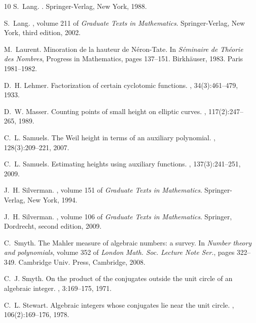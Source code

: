\documentclass[12pt,reqno]{amsart}
\begin{document}
\begin{thebibliography}{10}
S.~Lang.
.
\newblock Springer-Verlag, New York, 1988.

S.~Lang.
, volume 211 of {\em Graduate Texts in Mathematics}.
\newblock Springer-Verlag, New York, third edition, 2002.

M.~Laurent.
\newblock Minoration de la hauteur de {N}\'eron-{T}ate.
\newblock In {\em S\'eminaire de Th\'eorie des Nombres}, Progress in
  Mathematics, pages 137--151. Birkh\"auser, 1983.
\newblock Paris 1981--1982.

D.~H. Lehmer.
\newblock Factorization of certain cyclotomic functions.
, 34(3):461--479, 1933.

D.~W. Masser.
\newblock Counting points of small height on elliptic curves.
, 117(2):247--265, 1989.

C.~L. Samuels.
\newblock The {W}eil height in terms of an auxiliary polynomial.
, 128(3):209--221, 2007.

C.~L. Samuels.
\newblock Estimating heights using auxiliary functions.
, 137(3):241--251, 2009.

J.~H. Silverman.
,
  volume 151 of {\em Graduate Texts in Mathematics}.
\newblock Springer-Verlag, New York, 1994.

J.~H. Silverman.
, volume 106 of {\em
  Graduate Texts in Mathematics}.
\newblock Springer, Dordrecht, second edition, 2009.

C.~Smyth.
\newblock The {M}ahler measure of algebraic numbers: a survey.
\newblock In {\em Number theory and polynomials}, volume 352 of {\em London
  Math. Soc. Lecture Note Ser.}, pages 322--349. Cambridge Univ. Press,
  Cambridge, 2008.

C.~J. Smyth.
\newblock On the product of the conjugates outside the unit circle of an
  algebraic integer.
, 3:169--175, 1971.

C.~L. Stewart.
\newblock Algebraic integers whose conjugates lie near the unit circle.
, 106(2):169--176, 1978.

\end{thebibliography}



\end{document}
